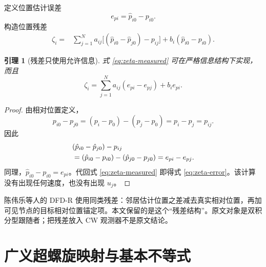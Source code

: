 \documentclass[UTF8,a4paper,12pt]{ctexart}
\newtheorem{lemma}{引理}
\begin{document}
定义位置估计误差
\begin{equation}
  e_{pi}=\hat p_{i0}-p_{i0}.
\end{equation}
构造位置残差
\begin{equation}
\begin{aligned}
 \zeta_i
 ={}&\sum_{j=1}^Na_{ij}
 \big[(\hat p_{i0}-\hat p_{j0})-p_{ij}\big]
 +b_i(\hat p_{i0}-p_{i0}).
\end{aligned}
\label{eq:zeta-measured}
\end{equation}

\begin{lemma}[残差只使用允许信息]
式 \eqref{eq:zeta-measured} 可在严格信息结构下实现，而且
\begin{equation}
 \zeta_i=\sum_{j=1}^Na_{ij}(e_{pi}-e_{pj})+b_ie_{pi}.
\label{eq:zeta-error}
\end{equation}
\end{lemma}

\begin{proof}
由相对位置定义，
\begin{equation}
 p_{i0}-p_{j0}
 =(p_i-p_0)-(p_j-p_0)=p_i-p_j=p_{ij}.
\end{equation}
因此
\begin{align}
 &(\hat p_{i0}-\hat p_{j0})-p_{ij}\notag\\
 &=(\hat p_{i0}-p_{i0})-(\hat p_{j0}-p_{j0})
 =e_{pi}-e_{pj}.
\end{align}
同理，$\hat p_{i0}-p_{i0}=e_{pi}$。代回式 \eqref{eq:zeta-measured} 即得式 \eqref{eq:zeta-error}。该计算没有出现任何速度，也没有出现 $u_j$。
\end{proof}

\begin{chenbox}
陈伟乐等人的 DFD-R 使用同类残差：邻居估计位置之差减去真实相对位置，再加可见节点的目标相对位置锚定项。本文保留的是这个“残差结构”。原文对象是双积分型跟随者；把残差放入 CW 观测器不是原文结论。
\end{chenbox}

\section{广义超螺旋映射与基本不等式}
\end{document}
